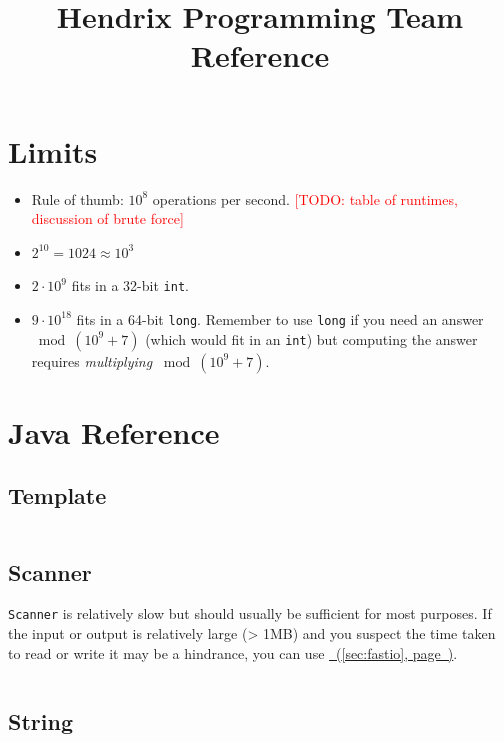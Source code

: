 \documentclass[10pt]{book}
\newcommand{\code}[1]{\inputminted[fontsize=\normalsize]{java}{code/#1}}
\newcommand*{\fulllink}[1]{\hyperref[{#1}]{\nameref*{#1}~(\ref*{#1}, page~\pageref*{#1})}}
\newcommand{\todo}[1]{\textcolor{red}{[TODO: #1]}}
\begin{document}
\title{Hendrix Programming Team Reference}

\maketitle

\tableofcontents
\newpage

\chapter{Limits}

\begin{itemize}
\item Rule of thumb: $10^8$ operations per second.
  \todo{table of runtimes, discussion of brute force}
\item $2^{10} = 1024 \approx 10^3$
\item $2 \cdot 10^9$ fits in a 32-bit \texttt{int}.
\item $9 \cdot 10^{18}$ fits in a 64-bit \texttt{long}.  Remember to
  use \texttt{long} if you need an answer $\bmod (10^9 + 7)$ (which
  would fit in an \texttt{int}) but computing the answer requires
  \emph{multiplying} $\bmod (10^9 + 7)$.
\end{itemize}

\chapter{Java Reference}

\section{Template}

\code{java/Template.java}

\section{Scanner}

\texttt{Scanner} is relatively slow but should usually be sufficient
for most purposes.  If the input or output is relatively large (> 1MB)
and you suspect the time taken to read or write it may be a hindrance,
you can use \fulllink{sec:fastio}.

\code{java/ScannerExample.java}

\section{String}
\end{document}
